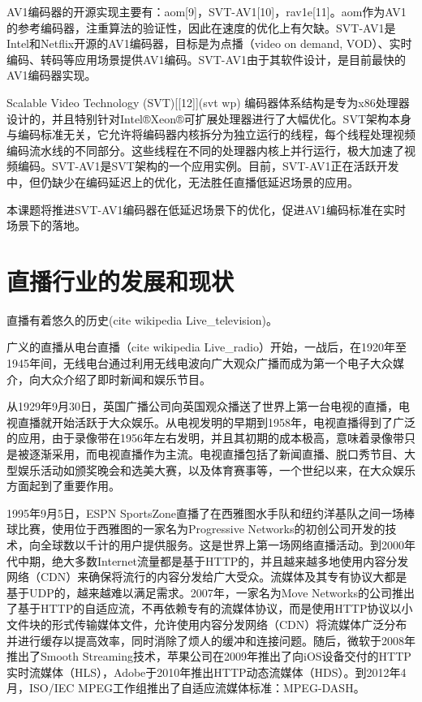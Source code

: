 AV1编码器的开源实现主要有：aom[9]，SVT-AV1[10]，rav1e[11]。aom作为AV1的参考编码器，注重算法的验证性，因此在速度的优化上有欠缺。SVT-AV1是Intel和Netflix开源的AV1编码器，目标是为点播（video on demand, VOD）、实时编码、转码等应用场景提供AV1编码。SVT-AV1由于其软件设计，是目前最快的AV1编码器实现。

Scalable Video Technology (SVT)[[12]](svt wp) 编码器体系结构是专为x86处理器设计的，并且特别针对Intel®Xeon®可扩展处理器进行了大幅优化。SVT架构本身与编码标准无关，它允许将编码器内核拆分为独立运行的线程，每个线程处理视频编码流水线的不同部分。这些线程在不同的处理器内核上并行运行，极大加速了视频编码。SVT-AV1是SVT架构的一个应用实例。目前，SVT-AV1正在活跃开发中，但仍缺少在编码延迟上的优化，无法胜任直播低延迟场景的应用。

本课题将推进SVT-AV1编码器在低延迟场景下的优化，促进AV1编码标准在实时场景下的落地。

\section{直播行业的发展和现状}

直播有着悠久的历史(cite wikipedia Live\_television)。

广义的直播从电台直播（cite wikipedia Live\_radio）开始，一战后，在1920年至1945年间，无线电台通过利用无线电波向广大观众广播而成为第一个电子大众媒介，向大众介绍了即时新闻和娱乐节目。

从1929年9月30日，英国广播公司向英国观众播送了世界上第一台电视的直播，电视直播就开始活跃于大众娱乐。从电视发明的早期到1958年，电视直播得到了广泛的应用，由于录像带在1956年左右发明，并且其初期的成本极高，意味着录像带只是被逐渐采用，而电视直播作为主流。电视直播包括了新闻直播、脱口秀节目、大型娱乐活动如颁奖晚会和选美大赛，以及体育赛事等，一个世纪以来，在大众娱乐方面起到了重要作用。

1995年9月5日，ESPN SportsZone直播了在西雅图水手队和纽约洋基队之间一场棒球比赛，使用位于西雅图的一家名为Progressive Networks的初创公司开发的技术，向全球数以千计的用户提供服务。这是世界上第一场网络直播活动。到2000年代中期，绝大多数Internet流量都是基于HTTP的，并且越来越多地使用内容分发网络（CDN）来确保将流行的内容分发给广大受众。流媒体及其专有协议大都是基于UDP的，越来越难以满足需求。2007年，一家名为Move Networks的公司推出了基于HTTP的自适应流，不再依赖专有的流媒体协议，而是使用HTTP协议以小文件块的形式传输媒体文件，允许使用内容分发网络（CDN）将流媒体广泛分布并进行缓存以提高效率，同时消除了烦人的缓冲和连接问题。随后，微软于2008年推出了Smooth Streaming技术，苹果公司在2009年推出了向iOS设备交付的HTTP实时流媒体（HLS），Adobe于2010年推出HTTP动态流媒体（HDS）。到2012年4月，ISO/IEC MPEG工作组推出了自适应流媒体标准：MPEG-DASH。

